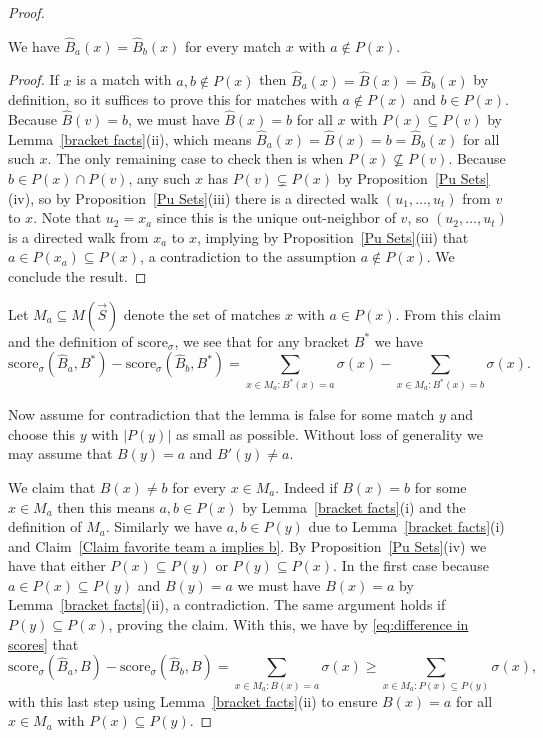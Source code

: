 \documentclass[10pt,a4paper]{amsart}
\newcommand{\score}{\mathrm{score}}
\newcommand{\sig}{\sigma}
\newcommand{\sub}{\subseteq}
\newcommand{\tour}{\vec{S}}
\begin{document}
\begin{proof}
	\begin{claim}
		We have $\widehat{B}_a(x)=\widehat{B}_b(x)$ for every match $x$ with $a\notin P(x)$.
	\end{claim}
	\begin{proof}
		If $x$ is a match with $a,b\notin P(x)$ then $\widehat{B}_a(x)=\widehat{B}(x)=\widehat{B}_b(x)$ by definition, so it suffices to prove this for matches with $a\notin P(x)$ and $b\in P(x)$.  Because $\widehat{B}(v)=b$, we must have $\widehat{B}(x)=b$ for all $x$ with $P(x)\sub P(v)$ by Lemma~\ref{bracket facts}(ii), which means $\widehat{B}_a(x)=\widehat{B}(x)=b=\widehat{B}_b(x)$ for all such $x$.  The only remaining case to check then is when $P(x)\not \sub P(v)$.  Because $b\in P(x)\cap P(v)$, any such $x$ has $P(v)\subsetneq P(x)$ by Proposition~\ref{Pu Sets}(iv), so by Proposition~\ref{Pu Sets}(iii) there is a directed walk $(u_1,\ldots,u_t)$ from $v$ to $x$.  Note that $u_2=x_a$ since this is the unique out-neighbor of $v$, so $(u_2,\ldots,u_t)$ is a directed walk from $x_a$ to $x$, implying by Proposition~\ref{Pu Sets}(iii) that $a\in P(x_a)\sub P(x)$, a contradiction to the assumption $a\notin P(x)$.  We conclude the result.
	\end{proof}
	Let $M_a\sub M(\tour)$ denote the set of matches $x$ with $a\in P(x)$.  From this claim and the definition of $\score_\sig$, we see that for any bracket $B^*$ we have
		\begin{equation}\score_\sig(\widehat{B}_a,B^*)-\score_\sig(\widehat{B}_b,B^*)=\sum_{x\in M_a:B^*(x)=a}\sig(x)-\sum_{x\in M_a:B^*(x)=b}\sig(x).\label{eq:difference in scores}\end{equation}

	Now assume for contradiction that the lemma is false for some match $y$ and choose this $y$ with $|P(y)|$ as small as possible.  Without loss of generality we may assume that $B(y)=a$ and $B'(y)\ne a$.
	
	We claim that $B(x)\ne b$ for every $x\in M_a$.  Indeed if $B(x)=b$ for some $x\in M_a$ then this means $a,b\in P(x)$ by Lemma~\ref{bracket facts}(i) and the definition of $M_a$.  Similarly we have $a,b\in P(y)$ due to Lemma~\ref{bracket facts}(i) and Claim~\ref{Claim favorite team a implies b}.  By Proposition~\ref{Pu Sets}(iv) we have that either $P(x)\sub P(y)$ or $P(y)\sub P(x)$.  In the first case because $a\in P(x)\sub P(y)$ and $B(y)=a$ we must have $B(x)=a$ by Lemma~\ref{bracket facts}(ii), a contradiction.  The same argument holds if $P(y)\sub P(x)$, proving the claim.  With this, we have by \eqref{eq:difference in scores} that
	\[\score_\sig(\widehat{B}_a,B)-\score_\sig(\widehat{B}_b,B)= \sum_{x\in M_a:B(x)=a}\sig(x)\ge \sum_{x\in M_a: P(x)\sub P(y)} \sig(x),\]
	with this last step using Lemma~\ref{bracket facts}(ii) to ensure $B(x)=a$ for all $x\in M_a$ with $P(x)\sub P(y)$.
	

\end{proof}
\end{document}
